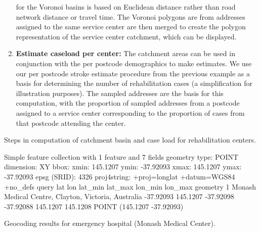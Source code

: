 \documentclass[utf8]{frontiersHLTH}
\begin{document}
\begin{table}[h]
\begin{center}
\begin{enumerate}
  for the Voronoi basins is based on Euclidean distance rather than road
  network distance or travel time. The Voronoi polygons are from
  addresses assigned to the same service center are then merged to
  create the polygon representation of the service center catchment,
  which can be displayed.
\item
  {\bf Estimate caseload per center:} The catchment areas can be used in
  conjunction with the per postcode demographics to make estimates. We
  use our per postcode stroke estimate procedure from the previous
  example as a basis for determining the number of rehabilitation cases
  (a simplification for illustration purposes). The sampled addresses
  are the basis for this computation, with the proportion of sampled
  addresses from a postcode assigned to a service center corresponding
  to the proportion of cases from that postcode attending the center.
\end{enumerate}
\end{center}
\caption{Steps in computation of catchment basin and case load for
  rehabilitation centers. \label{tab:exampleA}}
\end{table}

\begin{table}[h]
\small
\begin{verbnobox}[\fontsize{6pt}{6pt}\selectfont]
Simple feature collection with 1 feature and 7 fields
geometry type:  POINT
dimension:      XY
bbox:           xmin: 145.1207 ymin: -37.92093 xmax: 145.1207 ymax: -37.92093
epsg (SRID):    4326
proj4string:    +proj=longlat +datum=WGS84 +no_defs
                                                query       lat      lon   lat_min   lat_max  lon_min  lon_max                   geometry
1 Monash Medical Centre, Clayton, Victoria, Australia -37.92093 145.1207 -37.92098 -37.92088 145.1207 145.1208 POINT (145.1207 -37.92093)
\end{verbnobox}
\normalsize
\caption{Geocoding results for emergency hospital (Monash Medical Center).\label{tab:GeocodeMMC}}
\end{table}
\end{document}
